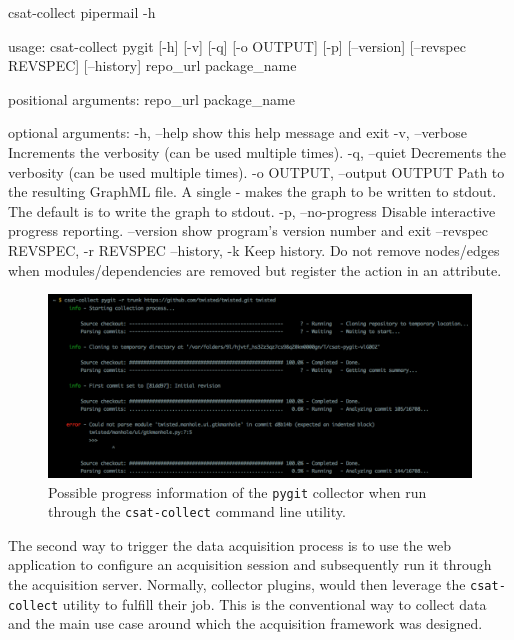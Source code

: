 \begin{userprompt}[caption={Specific help for the \texttt{pygit}collector, as shown by the \texttt{csat-collect} command line utility.},label=lst:pygit-help]
csat-collect pipermail -h
\end{userprompt}
\begin{cmdresult}
usage: csat-collect pygit [-h] [-v] [-q] [-o OUTPUT] [-p] [--version]
                          [--revspec REVSPEC] [--history]
                          repo_url package_name

positional arguments:
  repo_url
  package_name

optional arguments:
  -h, --help            show this help message and exit
  -v, --verbose         Increments the verbosity (can be used multiple times).
  -q, --quiet           Decrements the verbosity (can be used multiple times).
  -o OUTPUT, --output OUTPUT
                        Path to the resulting GraphML file. A single - makes
                        the graph to be written to stdout. The default is to
                        write the graph to stdout.
  -p, --no-progress     Disable interactive progress reporting.
  --version             show program's version number and exit
  --revspec REVSPEC, -r REVSPEC
  --history, -k         Keep history. Do not remove nodes/edges when
                        modules/dependencies are removed but register the
                        action in an attribute.
\end{cmdresult}

\begin{figure}
  \centering
  \includegraphics[width=\linewidth]{images/pygit-output}
  \caption[Example output of the \texttt{pygit} collector.]{Possible progress information of the \texttt{pygit} collector when run through the \texttt{csat-collect} command line utility.}
  \label{fig:pygit-output}
\end{figure}

The second way to trigger the data acquisition process is to use the web application to configure an acquisition session and subsequently run it through the acquisition server. Normally, collector plugins, would then leverage the \texttt{csat-collect} utility to fulfill their job. This is the conventional way to collect data and the main use case around which the acquisition framework was designed.


